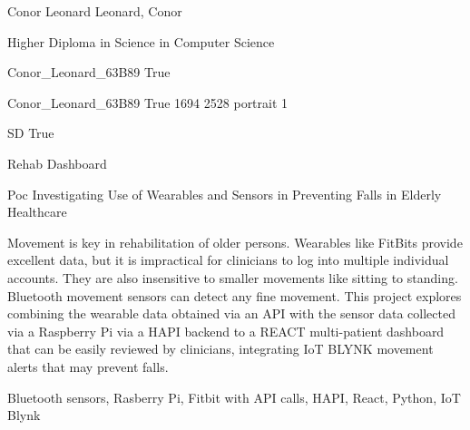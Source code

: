 \documentclass[twoside]{report}
\begin{document}
\begingroup{}\relax



\def\Key{Conor_Leonard_63B89}

{Conor Leonard}
{Leonard, Conor}

{Higher Diploma in Science in Computer Science}

{Conor_Leonard_63B89}
{True}

{Conor_Leonard_63B89}
{True}
{1694}
{2528}
{portrait}
{1}

{SD}
{True}

{Rehab Dashboard}

{Poc Investigating Use of Wearables and Sensors in Preventing Falls in Elderly Healthcare}

{Movement is key in rehabilitation of older persons.  Wearables like FitBits provide excellent data, but it is impractical for clinicians to log into multiple individual accounts. They are also insensitive to smaller movements like sitting to standing. Bluetooth movement sensors can detect any fine movement. This project explores combining the wearable data obtained via an API with the sensor data collected via a Raspberry Pi via a HAPI backend to a REACT multi-patient dashboard that can be easily reviewed by clinicians, integrating IoT BLYNK movement alerts that may prevent falls.}

{Bluetooth sensors, Rasberry Pi, Fitbit with API calls, HAPI, React, Python, IoT Blynk}
\end{document}
